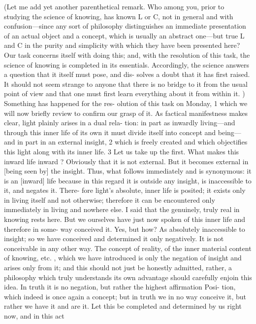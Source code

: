 (Let me add yet another parenthetical remark.
 Who among you, prior to studying the science of knowing, has known L or C, not
in general and with confusion—since any sort of philosophy distinguishes an
immediate presentation of an actual object and a concept, which is usually an
abstract one—but true L and C in the purity and simplicity with which they
have been presented here? Our task concerns itself with doing this; and, with
the resolution of this task, the science of knowing is completed in its essentials.
Accordingly, the science answers a question that it itself must pose, and dis-
solves a doubt that it has first raised.
 It should not seem strange to anyone that
there is no bridge to it from the usual point of view and that one must first
learn everything about it from within it.
) Something has happened for the res-
olution of this task on Monday, 1 which we will now briefly review to confirm
our grasp of it.
As factical manifestness makes clear, light plainly arises in a dual rela-
tion: in part as inwardly living—and through this inner life of its own it must
divide itself into concept and being—and in part in an external insight, 2 which
is freely created and which objectifies this light along with its inner life.
 3 Let
us take up the first.
 What makes this inward life inward ? Obviously that it is
not external.
 But it becomes external in [being seen by] the insight.
 Thus,
what follows immediately and is synonymous: it is an [inward] life because in
this regard it is outside any insight, is inaccessible to it, and negates it.
 There-
fore light’s absolute, inner life is posited; it exists only in living itself and not
otherwise; therefore it can be encountered only immediately in living and
nowhere else.
 I said that the genuinely, truly real in knowing rests here.
But we ourselves have just now spoken of this inner life and therefore in some-
way conceived it.
 Yes, but how? As absolutely inaccessible to insight; so we
have conceived and determined it only negatively.
 It is not conceivable in any
other way.
 The concept of reality, of the inner material content of knowing,
etc.
, which we have introduced is only the negation of insight and arises only
from it; and this should not just be honestly admitted, rather, a philosophy
which truly understands its own advantage should carefully enjoin this idea.
In truth it is no negation, but rather the highest  affirmation {Posi-
tion}, which indeed is once again a concept; but in truth we in no way conceive
it, but rather we have it and are it.
Let this be completed and determined by us right now, and in this act

